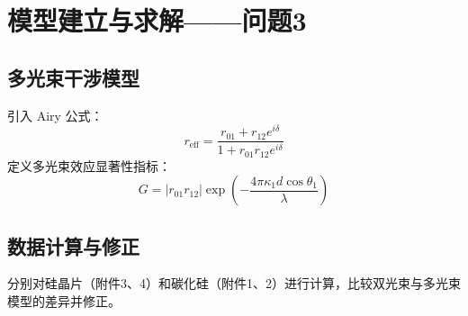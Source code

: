 
\section{模型建立与求解——问题3}

\subsection{多光束干涉模型}
引入 Airy 公式：
\begin{equation}
    r_{\text{eff}} = \frac{r_{01} + r_{12}e^{i\delta}}{1 + r_{01}r_{12}e^{i\delta}}
\end{equation}
定义多光束效应显著性指标：
\begin{equation}
    G = |r_{01}r_{12}| \exp\left(-\frac{4\pi \kappa_1 d \cos\theta_1}{\lambda}\right)
\end{equation}

\subsection{数据计算与修正}
分别对硅晶片（附件3、4）和碳化硅（附件1、2）进行计算，比较双光束与多光束模型的差异并修正。
